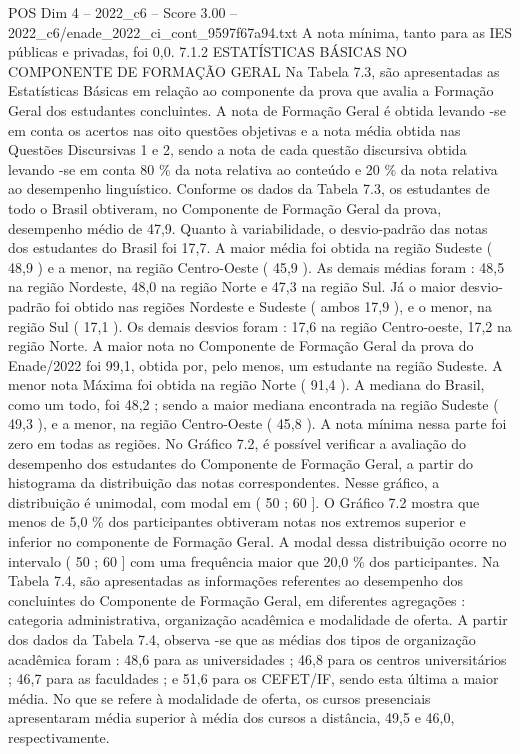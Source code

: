 \begin{textsample}{POS Dim 4 – 2022\_c6 – Score 3.00 – 2022\_c6/enade\_2022\_ci\_cont\_9597f67a94.txt}
A nota mínima, tanto para as IES públicas e privadas, foi 0,0. 7.1.2 ESTATÍSTICAS BÁSICAS NO COMPONENTE DE FORMAÇÃO GERAL Na Tabela 7.3, são apresentadas as Estatísticas Básicas em relação ao componente da prova que avalia a Formação Geral dos estudantes concluintes.
A nota de Formação Geral é obtida levando -se em conta os acertos nas oito questões objetivas e a nota média obtida nas Questões Discursivas 1 e 2, sendo a nota de cada questão discursiva obtida levando -se em conta 80 \% da nota relativa ao conteúdo e 20 \% da nota relativa ao desempenho linguístico.
Conforme os dados da Tabela 7.3, os estudantes de todo o Brasil obtiveram, no Componente de Formação Geral da prova, desempenho médio de 47,9.
Quanto à variabilidade, o desvio-padrão das notas dos estudantes do Brasil foi 17,7.
A maior média foi obtida na região Sudeste ( 48,9 ) e a menor, na região Centro-Oeste ( 45,9 ).
As demais médias foram : 48,5 na região Nordeste, 48,0 na região Norte e 47,3 na região Sul.
Já o maior desvio-padrão foi obtido nas regiões Nordeste e Sudeste ( ambos 17,9 ), e o menor, na região Sul ( 17,1 ).
Os demais desvios foram : 17,6 na região Centro-oeste, 17,2 na região Norte.
A maior nota no Componente de Formação Geral da prova do Enade/2022 foi 99,1, obtida por, pelo menos, um estudante na região Sudeste.
A menor nota Máxima foi obtida na região Norte ( 91,4 ).
A mediana do Brasil, como um todo, foi 48,2 ; sendo a maior mediana encontrada na região Sudeste ( 49,3 ), e a menor, na região Centro-Oeste ( 45,8 ).
A nota mínima nessa parte foi zero em todas as regiões.
No Gráfico 7.2, é possível verificar a avaliação do desempenho dos estudantes do Componente de Formação Geral, a partir do histograma da distribuição das notas correspondentes.
Nesse gráfico, a distribuição é unimodal, com modal em ( 50 ; 60 ].
O Gráfico 7.2 mostra que menos de 5,0 \% dos participantes obtiveram notas nos extremos superior e inferior no componente de Formação Geral.
A modal dessa distribuição ocorre no intervalo ( 50 ; 60 ] com uma frequência maior que 20,0 \% dos participantes.
Na Tabela 7.4, são apresentadas as informações referentes ao desempenho dos concluintes do Componente de Formação Geral, em diferentes agregações : categoria administrativa, organização acadêmica e modalidade de oferta.
A partir dos dados da Tabela 7.4, observa -se que as médias dos tipos de organização acadêmica foram : 48,6 para as universidades ; 46,8 para os centros universitários ; 46,7 para as faculdades ; e 51,6 para os CEFET/IF, sendo esta última a maior média.
No que se refere à modalidade de oferta, os cursos presenciais apresentaram média superior à média dos cursos a distância, 49,5 e 46,0, respectivamente.

\end{textsample}
